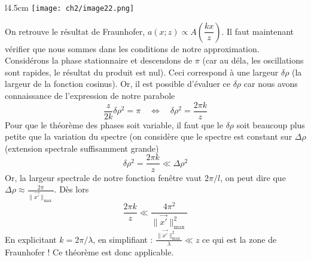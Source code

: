 		\begin{wrapfigure}[15]{l}{4.5cm}
	\texttt{[image: ch2/image22.png]}
	\end{wrapfigure}
	On retrouve le résultat de Fraunhofer, $a(x;z) \propto A\left(\dfrac{kx}{z}
	\right)$. Il faut maintenant vérifier que nous sommes dans les conditions de 
	notre approximation. Considérons la phase stationnaire et descendons de $\pi$ (car 
	au déla, les oscillations sont rapides, le résultat du produit est nul). Ceci 
	correspond à une largeur $\delta \rho$ (la largeur de la fonction cosinus). Or, 
	il est possible d'évaluer ce $\delta\rho$ car nous avons connaissance de l'expression 
	de notre parabole
	\begin{equation}
	\dfrac{z}{2k}\delta\rho^2 = \pi\quad\Leftrightarrow\quad \delta\rho^2 = \dfrac{
	2\pi k}{z}
	\end{equation}
	Pour que le théorème des phases soit variable, il faut que le $\delta \rho$ soit 
	beaucoup plus petite que la variation du spectre (on considère que le spectre 
	est constant sur $\Delta \rho$ (extension spectrale suffisamment grande)
	\begin{equation}
	\delta\rho^2 = \dfrac{2\pi k}{z} \ll \Delta \rho^2
	\end{equation}
	Or, la largeur spectrale de notre fonction fenêtre vaut $2\pi/l$, on peut dire que 
	$\Delta \rho \approx \frac{2\pi}{\|\vec{x'}\|_{\max}}$. Dès lors
	\begin{equation}
	\dfrac{2\pi k}{z}\ll \dfrac{4\pi^2}{\|\vec{x'}\|_{\max}^2}
	\end{equation}
	En explicitant $k=2\pi/\lambda$, en simplifiant : $\frac{\|\vec{x'}\|^2_{\max}}{\lambda}
	\ll z$ ce qui est la zone de Fraunhofer ! Ce théorème est donc applicable.\\
	

